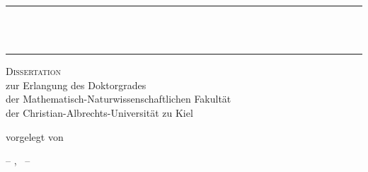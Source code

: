 \begin{titlepage}
\setlength{\hoffset}{0mm}
	\begin{addmargin}[-1cm]{-3cm}
    \begin{center}
        \large  

        \hfill

        \vfill

        \hrule
        \begingroup
            \vspace{.6cm}
            {\LARGE\myTitle} \\[0.3cm] 
	    	{\Large\mySubtitle} \\ 
        	\vspace{.6cm}
        \endgroup
        \hrule
	\vspace{1.5cm}
	\vspace{7.2cm}
    {\Large\textsc{Dissertation}}\\
	\vspace{.6cm}
        \begingroup
	    zur Erlangung des Doktorgrades\\
	    der Mathematisch-Naturwissenschaftlichen Fakult\"at\\
	    der Christian-Albrechts-Universit\"at zu Kiel
	\vspace{1.2cm}
        \endgroup     

	{	    
        vorgelegt von\\[0.3cm]
        \Large\textcolor{Maroon}{\myName}
    }

        \vfill

        

	\vspace{3cm}
        -- \myLocation, \myTime\ --
        \vfill                      

    \end{center}  
  \end{addmargin}       
\end{titlepage}   
